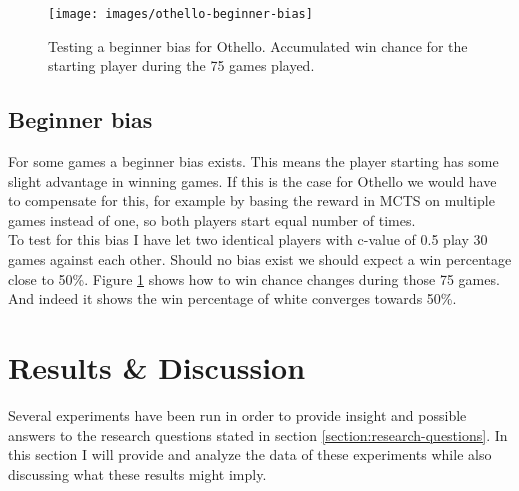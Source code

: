 \documentclass[
11pt, %
english, %
singlespacing, %
headsepline, %
]{MastersDoctoralThesis} %
\begin{document}
\begin{figure}
	\centering
	\texttt{[image: images/othello-beginner-bias]}
	\caption{Testing a beginner bias for Othello. Accumulated win chance for the starting player during the 75 games played.}
	\label{fig:othello-beginner-bias}
\end{figure}
\section{Beginner bias}
For some games a beginner bias exists. This means the player starting has some slight advantage in winning games. If this is the case for Othello we would have to compensate for this, for example by basing the reward in MCTS on multiple games instead of one, so both players start equal number of times.\\

To test for this bias I have let two identical players with c-value of 0.5 play 30 games against each other. Should no bias exist we should expect a win percentage close to 50\%. Figure \ref{fig:othello-beginner-bias} shows how to win chance changes during those 75 games. And indeed it shows the win percentage of white converges towards 50\%.


\chapter{Results \& Discussion}

Several experiments have been run in order to provide insight and possible answers to the research questions stated in section \ref{section:research-questions}. In this section I will provide and analyze the data of these experiments while also discussing what these results might imply.
\end{document}
